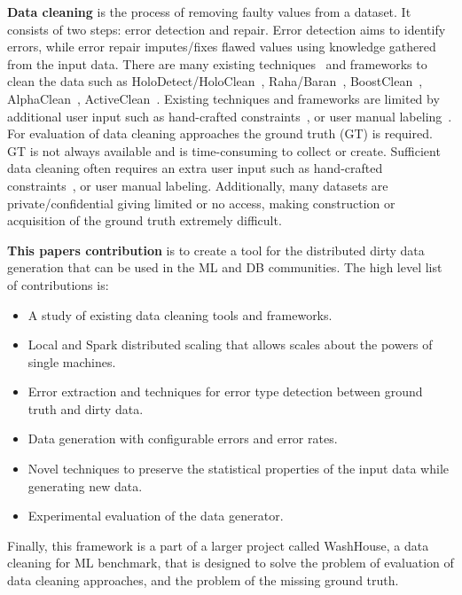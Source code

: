 \textbf{Data cleaning} is the process of removing faulty values from a dataset.
It consists of two steps: error detection and repair.
Error detection aims to identify errors, while error repair imputes/fixes flawed values using knowledge gathered from the input data. 
There are many existing techniques~\cite{duplicatesstudy, tdeexcel} and frameworks to clean the data such as HoloDetect/HoloClean~\cite{holodetect, RekatsinasCIR2017}, Raha/Baran~\cite{raha, baran}, BoostClean~\cite{boostclean}, AlphaClean~\cite{alphaclean}, ActiveClean~\cite{activeclean}. 
Existing techniques and frameworks are limited by additional user input such as hand-crafted constraints~\cite{bart}, or user manual labeling~\cite{raha, baran}.
For evaluation of data cleaning approaches the ground truth (GT) is required.
GT is not always available and is time-consuming to collect or create.
Sufficient data cleaning often requires an extra user input such as hand-crafted constraints~\cite{bart}, or user manual labeling.
Additionally, many datasets are private/confidential giving limited or no access, making construction or acquisition of the ground truth extremely difficult. 

\textbf{This papers contribution} is to create a tool for the distributed dirty data generation that can be used in the ML and DB communities. 
The high level list of contributions is:

\begin{itemize}
    \item A study of existing data cleaning tools and frameworks.
    \item Local and Spark distributed scaling that allows scales about the powers of single machines.
    \item Error extraction and techniques for error type detection between ground truth and dirty data.
    \item Data generation with configurable errors and error rates.
    \item Novel techniques to preserve the statistical properties of the input data while generating new data.
    \item Experimental evaluation of the data generator.
\end{itemize}

Finally, this framework is a part of a larger project called WashHouse, a data cleaning for ML benchmark, that is designed to solve the problem of evaluation of data cleaning approaches, and the problem of the missing ground truth.

